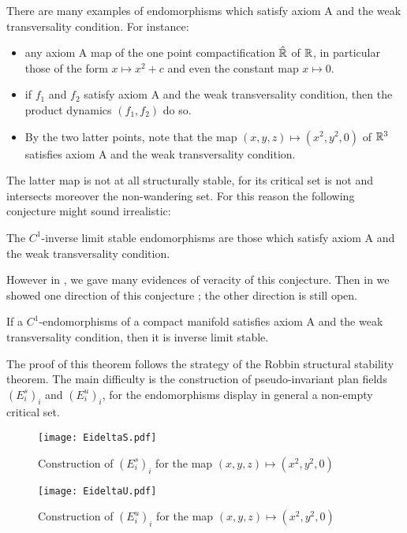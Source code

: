 \documentclass[11pt,openany,leqno]{article}
\begin{document}
There are many examples of endomorphisms which satisfy axiom A and the weak transversality condition. For instance:
\begin{itemize}
\item any axiom A map of the one point compactification $\hat {\mathbb R}$ of $\mathbb R$, in particular those of the form $x\mapsto x^2+c$ and even the constant map $x\mapsto 0$.
\item if $f_1$ and $f_2$ satisfy axiom A and the weak transversality condition, then the product dynamics $(f_1,f_2)$ do so.
\item By the two latter points, note that the map $(x,y,z)\mapsto (x^2,y^2,0)$ of $\mathbb R^3$ satisfies axiom A and the weak transversality condition.
\end{itemize}
The latter map is not at all structurally stable, for its critical set is not and intersects moreover the non-wandering set. For this reason the following conjecture might sound irrealistic:
\begin{conj}
The $C^1$-inverse limit stable endomorphisms are  those which satisfy axiom A and the weak transversality condition.
\end{conj}
However  in \cite{BR13}, we gave many evidences of veracity of this conjecture. Then in \cite{BK13} we showed one direction of this conjecture ; the other direction is still open.
\begin{thm}\label{BK}
If a $C^1$-endomorphisms of a compact manifold satisfies  axiom A and the weak transversality condition, then it is inverse limit stable. 
\end{thm}
The proof of this theorem follows the strategy of the Robbin structural stability theorem. The main difficulty is the construction of pseudo-invariant plan fields $(E_i^s)_i$  and $(E_i^u)_i$, for the endomorphisms display in general a non-empty critical set.  

\begin{figure}[h!]
	\centering
		\texttt{[image: EideltaS.pdf]}
	\caption{Construction of $(E_i^s)_i$ for the map $(x,y,z)\mapsto (x^2,y^2,0)$ }
\end{figure}
\begin{figure}[h!]
	\centering
		\texttt{[image: EideltaU.pdf]}
	\caption{Construction of $(E_i^u)_i$ for the map $(x,y,z)\mapsto (x^2,y^2,0)$}
\end{figure}
\end{document}

